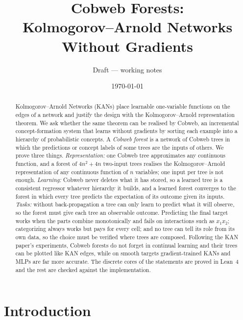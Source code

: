 \title{Cobweb Forests:\\ Kolmogorov--Arnold Networks Without Gradients}
\author{Draft --- working notes}
\date{\today}


\maketitle

\begin{abstract}
Kolmogorov--Arnold Networks (KANs) place learnable one-variable functions on the edges
of a network and justify the design with the Kolmogorov--Arnold representation theorem.
We ask whether the same theorem can be realised by Cobweb, an incremental
concept-formation system that learns without gradients by sorting each example into a
hierarchy of probabilistic concepts.  A \emph{Cobweb forest} is a network of Cobweb trees
in which the predictions or concept labels of some trees are the inputs of others.  We
prove three things.  \emph{Representation:} one Cobweb tree approximates any continuous
function, and a forest of $4n^2+4n$ two-input trees realises the Kolmogorov--Arnold
representation of any continuous function of $n$ variables; one input per tree is not
enough.  \emph{Learning:} Cobweb never deletes what it has stored, so a learned tree is a
consistent regressor whatever hierarchy it builds, and a learned forest converges to the
forest in which every tree predicts the expectation of its outcome given its inputs.
\emph{Tasks:} without back-propagation a tree can only learn to predict what it will
observe, so the forest must give each tree an observable outcome.  Predicting the final
target works when the parts combine monotonically and fails on interactions such as
$x_1x_2$; categorizing always works but pays for every cell; and no tree can tell its
role from its own data, so the choice must be verified where trees are composed.
Following the KAN paper's experiments, Cobweb forests do not forget in continual
learning and their trees can be plotted like KAN edges, while on smooth targets
gradient-trained KANs and MLPs are far more accurate.  The discrete cores of the
statements are proved in Lean~4 and the rest are checked against the implementation.
\end{abstract}

\tableofcontents

\section{Introduction}\label{sec:intro}

